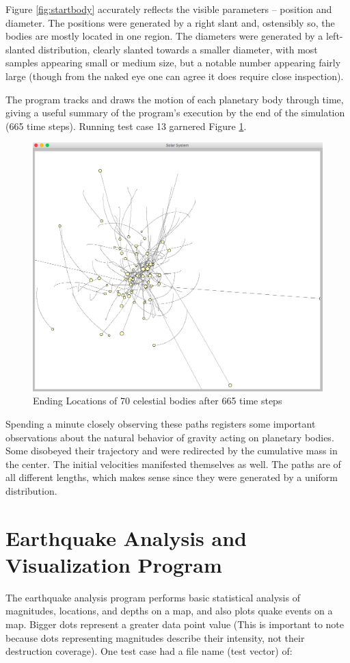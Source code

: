 Figure \ref{fig:startbody} accurately reflects the visible parameters – position and diameter. The positions were generated by a right slant and, ostensibly so, the bodies are mostly located in one region. The diameters were generated by a left-slanted distribution, clearly slanted towards a smaller diameter, with most samples appearing small or medium size, but a notable number appearing fairly large (though from the naked eye one can agree it does require close inspection).

The program tracks and draws the motion of each planetary body through time, giving a useful summary of the program's execution by the end of the simulation (665 time steps). Running test case 13 garnered Figure \ref{fig:endbody}.

\begin{figure}[h!]
\centering
\includegraphics[scale=0.4]{final-ex.png}
\caption{Ending Locations of 70 celestial bodies after 665 time steps}
\label{fig:endbody}
\end{figure}

Spending a minute closely observing these paths registers some important observations about the natural behavior of gravity acting on planetary bodies. Some disobeyed their trajectory and were redirected by the cumulative mass in the center. The initial velocities manifested themselves as well. The paths are of all different lengths, which makes sense since they were generated by a uniform distribution.

\section{Earthquake Analysis and Visualization Program}
The earthquake analysis program performs basic statistical analysis of magnitudes, locations, and depths on a map, and also plots quake events on a map. Bigger dots represent a greater data point value (This is important to note because dots representing magnitudes describe their intensity, not their destruction coverage). One test case had a file name (test vector) of:
\vspace{1cm}

